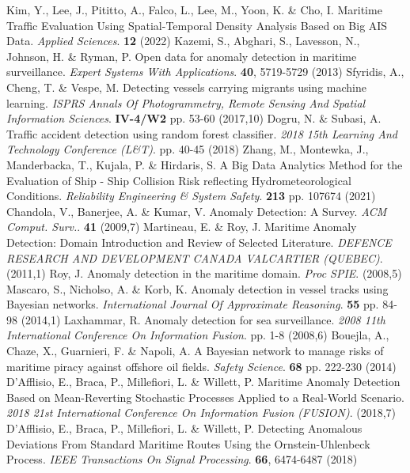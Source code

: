 Kim, Y., Lee, J., Pititto, A., Falco, L., Lee, M., Yoon, K. \& Cho, I. Maritime Traffic Evaluation Using Spatial-Temporal Density Analysis Based on Big AIS Data. {\em Applied Sciences}. \textbf{12} (2022)
Kazemi, S., Abghari, S., Lavesson, N., Johnson, H. \& Ryman, P. Open data for anomaly detection in maritime surveillance. {\em Expert Systems With Applications}. \textbf{40}, 5719-5729 (2013)
Sfyridis, A., Cheng, T. \& Vespe, M. Detecting vessels carrying migrants using machine learning. {\em ISPRS Annals Of Photogrammetry, Remote Sensing And Spatial Information Sciences}. \textbf{IV-4/W2} pp. 53-60 (2017,10)
Dogru, N. \& Subasi, A. Traffic accident detection using random forest classifier. {\em 2018 15th Learning And Technology Conference (L\&T)}. pp. 40-45 (2018)
Zhang, M., Montewka, J., Manderbacka, T., Kujala, P. \& Hirdaris, S. A Big Data Analytics Method for the Evaluation of Ship - Ship Collision Risk reflecting Hydrometeorological Conditions. {\em Reliability Engineering \& System Safety}. \textbf{213} pp. 107674 (2021)
Chandola, V., Banerjee, A. \& Kumar, V. Anomaly Detection: A Survey. {\em ACM Comput. Surv.}. \textbf{41} (2009,7)
Martineau, E. \& Roy, J. Maritime Anomaly Detection: Domain Introduction and Review of Selected Literature. {\em DEFENCE RESEARCH AND DEVELOPMENT CANADA VALCARTIER (QUEBEC)}. (2011,1)
Roy, J. Anomaly detection in the maritime domain. {\em Proc SPIE}. (2008,5)
Mascaro, S., Nicholso, A. \& Korb, K. Anomaly detection in vessel tracks using Bayesian networks. {\em International Journal Of Approximate Reasoning}. \textbf{55} pp. 84-98 (2014,1)
Laxhammar, R. Anomaly detection for sea surveillance. {\em 2008 11th International Conference On Information Fusion}. pp. 1-8 (2008,6)
Bouejla, A., Chaze, X., Guarnieri, F. \& Napoli, A. A Bayesian network to manage risks of maritime piracy against offshore oil fields. {\em Safety Science}. \textbf{68} pp. 222-230 (2014)
D'Afflisio, E., Braca, P., Millefiori, L. \& Willett, P. Maritime Anomaly Detection Based on Mean-Reverting Stochastic Processes Applied to a Real-World Scenario. {\em 2018 21st International Conference On Information Fusion (FUSION)}. (2018,7)
D'Afflisio, E., Braca, P., Millefiori, L. \& Willett, P. Detecting Anomalous Deviations From Standard Maritime Routes Using the Ornstein-Uhlenbeck Process. {\em IEEE Transactions On Signal Processing}. \textbf{66}, 6474-6487 (2018)
